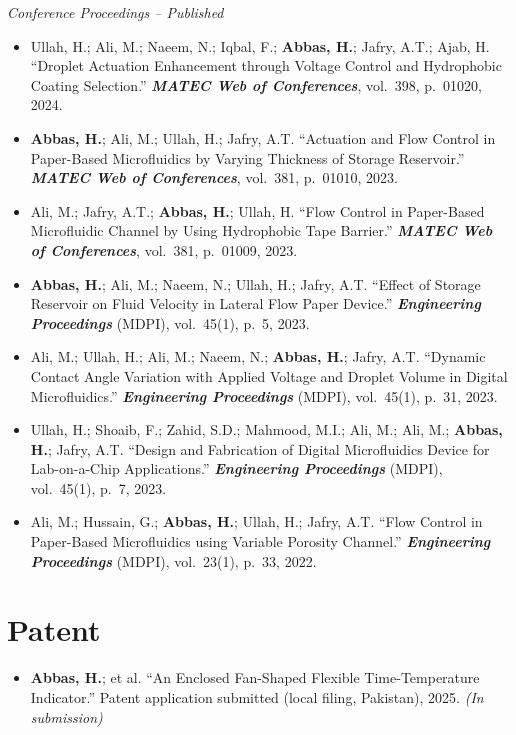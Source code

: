 \documentclass[11pt,a4paper]{article}
\begin{document}
\vspace{4pt}
\textit{Conference Proceedings -- Published}
\begin{itemize}
  \item Ullah, H.; Ali, M.; Naeem, N.; Iqbal, F.; \textbf{Abbas, H.}; Jafry,
        A.T.; Ajab, H. ``Droplet Actuation Enhancement through Voltage Control
        and Hydrophobic Coating Selection.''
        \textbf{\textit{MATEC Web of Conferences}}, vol.~398, p.~01020, 2024.
  \item \textbf{Abbas, H.}; Ali, M.; Ullah, H.; Jafry, A.T. ``Actuation and
        Flow Control in Paper-Based Microfluidics by Varying Thickness of Storage
        Reservoir.''
        \textbf{\textit{MATEC Web of Conferences}}, vol.~381, p.~01010, 2023.
  \item Ali, M.; Jafry, A.T.; \textbf{Abbas, H.}; Ullah, H. ``Flow Control in
        Paper-Based Microfluidic Channel by Using Hydrophobic Tape Barrier.''
        \textbf{\textit{MATEC Web of Conferences}}, vol.~381, p.~01009, 2023.
  \item \textbf{Abbas, H.}; Ali, M.; Naeem, N.; Ullah, H.; Jafry, A.T. ``Effect
        of Storage Reservoir on Fluid Velocity in Lateral Flow Paper Device.''
        \textbf{\textit{Engineering Proceedings}} (MDPI), vol.~45(1), p.~5, 2023.
  \item Ali, M.; Ullah, H.; Ali, M.; Naeem, N.; \textbf{Abbas, H.}; Jafry, A.T.
        ``Dynamic Contact Angle Variation with Applied Voltage and Droplet Volume
        in Digital Microfluidics.''
        \textbf{\textit{Engineering Proceedings}} (MDPI), vol.~45(1), p.~31, 2023.
  \item Ullah, H.; Shoaib, F.; Zahid, S.D.; Mahmood, M.I.; Ali, M.; Ali, M.;
        \textbf{Abbas, H.}; Jafry, A.T. ``Design and Fabrication of Digital
        Microfluidics Device for Lab-on-a-Chip Applications.''
        \textbf{\textit{Engineering Proceedings}} (MDPI), vol.~45(1), p.~7, 2023.
  \item Ali, M.; Hussain, G.; \textbf{Abbas, H.}; Ullah, H.; Jafry, A.T. ``Flow
        Control in Paper-Based Microfluidics using Variable Porosity Channel.''
        \textbf{\textit{Engineering Proceedings}} (MDPI), vol.~23(1), p.~33, 2022.
\end{itemize}

\section{Patent}

\begin{itemize}
  \item \textbf{Abbas, H.}; et al. ``An Enclosed Fan-Shaped Flexible
        Time-Temperature Indicator.'' Patent application submitted (local filing,
        Pakistan), 2025. \textit{(In submission)}
\end{itemize}
\end{document}
